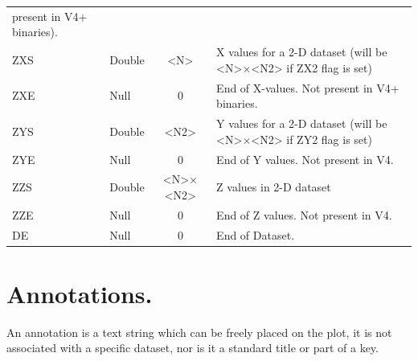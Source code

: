 \documentclass[english]{article}
\begin{document}
\begin{longtable}{|llcp{8cm}|}
  present in V4+ binaries).\\
  ZXS& Double& <N>&
  X values for a 2-D dataset (will be <N>$\times$<N2> if ZX2 flag is set) \\
  ZXE& Null& 0&
  End of X-values. Not present in V4+ binaries.\\
  ZYS& Double& <N2>&
  Y values for a 2-D dataset (will be <N>$\times$<N2> if ZY2 flag is set)\\
  ZYE& Null& 0&
  End of Y values. Not present in V4.\\
  ZZS& Double& <N>$\times$<N2>&
  Z values in 2-D dataset\\
  ZZE& Null& 0&
  End of Z values. Not present in V4.\\
  DE& Null& 0&
  End of Dataset.\\
\end{longtable}


\section{Annotations.}

An annotation is a text string which can be freely placed on the plot,
it is not associated with a specific dataset, nor is it a standard
title or part of a key.
\end{document}
